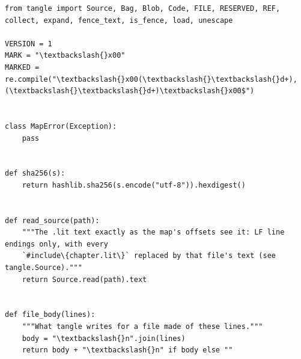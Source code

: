 \documentclass[10pt,a4paper]{article}
\begin{document}
\begin{Verbatim}
from tangle import Source, Bag, Blob, Code, FILE, RESERVED, REF, collect, expand, fence_text, is_fence, load, unescape

VERSION = 1
MARK = "\textbackslash{}x00"
MARKED = re.compile("\textbackslash{}x00(\textbackslash{}\textbackslash{}d+),(\textbackslash{}\textbackslash{}d+)\textbackslash{}x00$")


class MapError(Exception):
    pass


def sha256(s):
    return hashlib.sha256(s.encode("utf-8")).hexdigest()


def read_source(path):
    """The .lit text exactly as the map's offsets see it: LF line endings only, with every
    `#include\{chapter.lit\}` replaced by that file's text (see tangle.Source)."""
    return Source.read(path).text


def file_body(lines):
    """What tangle writes for a file made of these lines."""
    body = "\textbackslash{}n".join(lines)
    return body + "\textbackslash{}n" if body else ""
\end{Verbatim}
\end{document}
